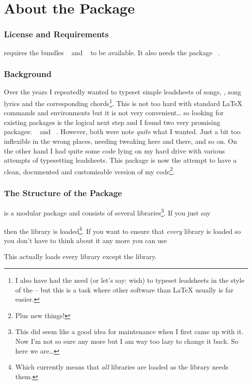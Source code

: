 \documentclass[load-preamble+]{cnltx-doc}
\def\library*#1{``#1''}%
\begin{document}
\part{About the Package}

\section{License and Requirements}

\license

\leadsheets{} requires the bundles ~\cite{bnd:l3kernel} and
~\cite{bnd:l3packages}  to be available.  It also needs the
package ~\cite{pkg:translations}.

\section{Background}

Over the years I repeatedly wanted to typeset simple leadsheets of songs, \ie,
song lyrics and the corresponding chords\footnote{I also have had the need (or
  let's say: wish) to typeset leadsheets in the style of the
   -- but this is a task where other software than
  \LaTeX{} usually is far easier.}.  This is not too hard with standard
\LaTeX{} commands and environments but it is not very convenient\ldots{} so
looking for existing packages is the logical next step and I found two very
promising packages: ~\cite{pkg:songs} and
~\cite{pkg:songbook}.  However, both were note \emph{quite} what
I wanted.  Just a bit too inflexible in the wrong places, needing tweaking
here and there, and so on.  On the other hand I had quite some code lying on
my hard drive with various attempts of typesetting leadsheets.  This package
is now the attempt to have a clean, documented and customisable version of my
code\footnote{Plus new things!}.

\section{The Structure of the Package}
\leadsheets{} is a modular package and consists of several
libraries\footnote{This did seem like a good idea for maintenance when I first
  came up with it.  Now I'm not so sure any more but I am way too lazy to
  change it back.  So here we are\ldots}.  If you just say
\begin{sourcecode}
  \usepackage{leadsheets}
\end{sourcecode}
then the  library is loaded\footnote{Which currently means that
  \emph{all} libraries are loaded as the  library needs them.}.
If you want to ensure that \emph{every} library is loaded
so you don't have to think about it any more you can use
\begin{sourcecode}
  \usepackage[full]{leadsheets}
\end{sourcecode}
This actually loads every library except the  library.
\end{document}

